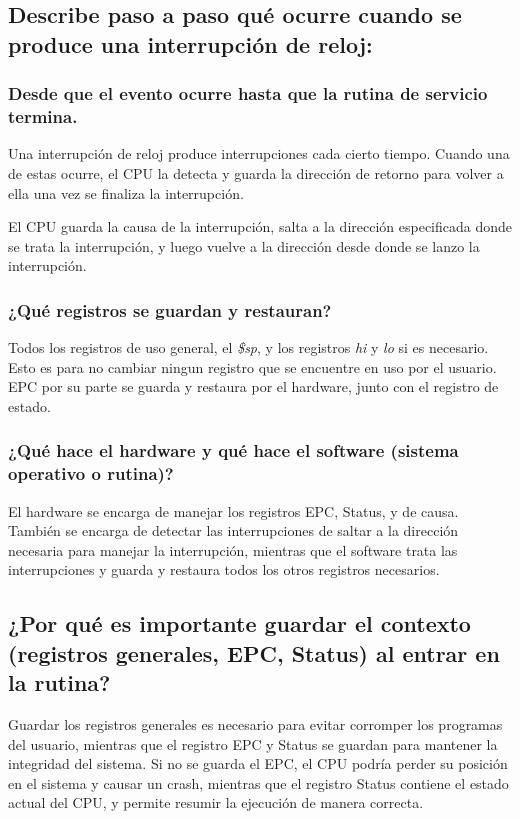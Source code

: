\documentclass[titlepage]{article}
\begin{document}
\subsection*{Describe paso a paso qué ocurre cuando se produce una interrupción de reloj:}

\subsubsection*{Desde que el evento ocurre hasta que la rutina de servicio termina.}

Una interrupción de reloj produce interrupciones cada cierto tiempo. Cuando una de estas ocurre, el CPU la detecta y guarda la dirección de retorno para volver a ella una vez se finaliza la interrupción.

El CPU guarda la causa de la interrupción, salta a la dirección especificada donde se trata la interrupción, y luego vuelve a la dirección desde donde se lanzo la interrupción.

\subsubsection*{¿Qué registros se guardan y restauran?}

Todos los registros de uso general, el \emph{\$sp}, y los registros \emph{hi} y \emph{lo} si es necesario. Esto es para no cambiar ningun registro que se encuentre en uso por el usuario. EPC por su parte se guarda y restaura por el hardware, junto con el registro de estado.

\subsubsection*{¿Qué hace el hardware y qué hace el software (sistema operativo o rutina)?}

El hardware se encarga de manejar los registros EPC, Status, y de causa. También se encarga de detectar las interrupciones de saltar a la dirección necesaria para manejar la interrupción, mientras que el software trata las interrupciones y guarda y restaura todos los otros registros necesarios.

\subsection*{¿Por qué es importante guardar el contexto (registros generales, EPC, Status) al entrar en la rutina?}

Guardar los registros generales es necesario para evitar corromper los programas del usuario, mientras que el registro EPC y Status se guardan para mantener la integridad del sistema. Si no se guarda el EPC, el CPU podría perder su posición en el sistema y causar un crash, mientras que el registro Status contiene el estado actual del CPU, y permite resumir la ejecución de manera correcta.
\end{document}
